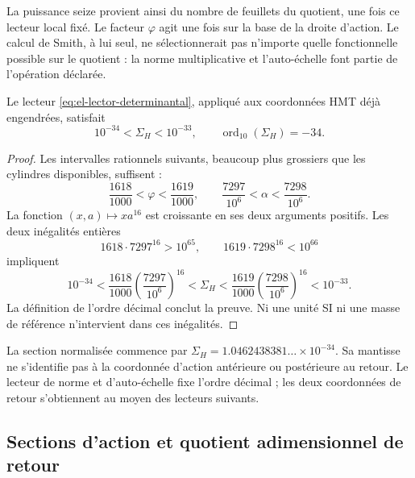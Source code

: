 La puissance seize provient ainsi du nombre de feuillets du quotient, une
fois ce lecteur local fixé. Le facteur \(\varphi\) agit une fois sur
la base de la droite d'action. Le calcul de Smith, à lui seul, ne
sélectionnerait pas n'importe quelle fonctionnelle possible sur le quotient : la norme
multiplicative et l'auto-échelle font partie de l'opération déclarée.

\begin{theorem}
Le lecteur \eqref{eq:el-lector-determinantal}, appliqué aux coordonnées
HMT déjà engendrées, satisfait
\begin{equation}
 10^{-34}<\Sigma_H<10^{-33},\qquad
 \operatorname{ord}_{10}(\Sigma_H)=-34.
 \label{eq:el-decada}
\end{equation}
\end{theorem}
\begin{proof}
Les intervalles rationnels suivants, beaucoup plus grossiers que les cylindres
disponibles, suffisent :
\[
 \frac{1618}{1000}<\varphi<\frac{1619}{1000},\qquad
 \frac{7297}{10^6}<\alpha<\frac{7298}{10^6}.
\]
La fonction \((x,a)\mapsto xa^{16}\) est croissante en ses deux arguments
positifs. Les deux inégalités entières
\[
 1618\cdot7297^{16}>10^{65},\qquad
 1619\cdot7298^{16}<10^{66}
\]
impliquent
\[
 10^{-34}
 <\frac{1618}{1000}\left(\frac{7297}{10^6}\right)^{16}
 <\Sigma_H
 <\frac{1619}{1000}\left(\frac{7298}{10^6}\right)^{16}
 <10^{-33}.
\]
La définition de l'ordre décimal conclut la preuve. Ni une
unité SI ni une masse de référence n'intervient dans ces inégalités.
\end{proof}

La section normalisée commence par
\(\Sigma_H=1.0462438381\ldots\times10^{-34}\). Sa mantisse ne
s’identifie pas à la coordonnée d’action antérieure ou postérieure au retour.
Le lecteur de norme et d’auto-échelle fixe l’ordre décimal ; les deux coordonnées de
retour s’obtiennent au moyen des lecteurs suivants.




\subsection{Sections d'action et quotient adimensionnel de retour}


